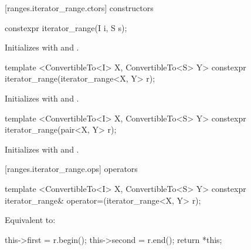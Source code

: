 [ranges.iterator_range.ctors]{ constructors}

%
\begin{itemdecl}
constexpr iterator_range(I i, S s);
\end{itemdecl}

\begin{itemdescr}
\pnum
\effects Initializes  with
 and .
\end{itemdescr}

%
\begin{itemdecl}
template <ConvertibleTo<I> X, ConvertibleTo<S> Y>
  constexpr iterator_range(iterator_range<X, Y> r);
\end{itemdecl}

\begin{itemdescr}
\pnum
\effects Initializes  with
 and .
\end{itemdescr}

%
\begin{itemdecl}
template <ConvertibleTo<I> X, ConvertibleTo<S> Y>
  constexpr iterator_range(pair<X, Y> r);
\end{itemdecl}

\begin{itemdescr}
\pnum
\effects Initializes  with
 and .
\end{itemdescr}

[ranges.iterator_range.ops]{ operators}

%
\begin{itemdecl}
template <ConvertibleTo<I> X, ConvertibleTo<S> Y>
  constexpr iterator_range& operator=(iterator_range<X, Y> r);
\end{itemdecl}

\begin{itemdescr}
\pnum
\effects Equivalent to:
\begin{codeblock}
this->first = r.begin();
this->second = r.end();
return *this;
\end{codeblock}
\end{itemdescr}

